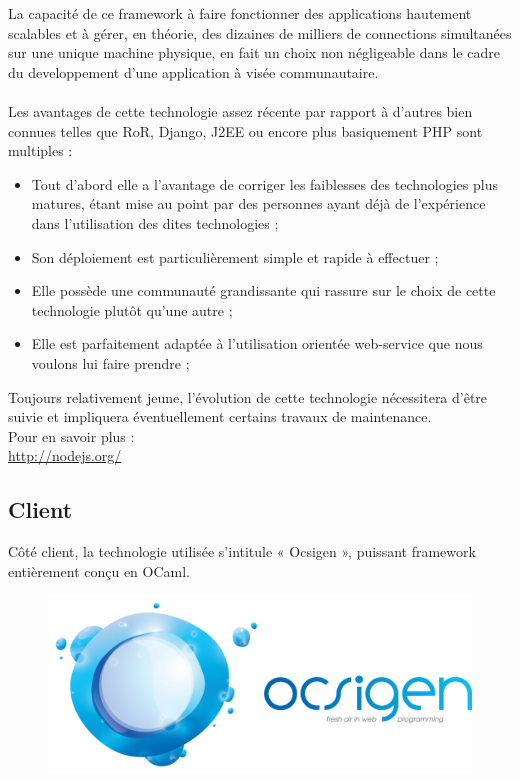 \documentclass{life-fr}
\begin{document}
La capacité de ce framework à faire fonctionner des applications hautement scalables et à gérer, en théorie, des dizaines de milliers de connections simultanées sur une unique machine physique, en fait un choix non négligeable dans le cadre du developpement d'une application à visée communautaire.\\
\\
\newpage
Les avantages de cette technologie assez récente par rapport à d'autres bien connues telles que RoR, Django, J2EE ou encore plus basiquement PHP sont multiples :\\
\begin{itemize}
  \item Tout d'abord elle a l'avantage de corriger les faiblesses des technologies plus matures, étant mise au point par des personnes ayant déjà de l'expérience dans l'utilisation des dites technologies ;
  \item Son déploiement est particulièrement simple et rapide à effectuer ;
  \item Elle possède une communauté grandissante qui rassure sur le choix de cette technologie plutôt qu'une autre ;
  \item Elle est parfaitement adaptée à l'utilisation orientée web-service que nous voulons lui faire prendre ;
\end{itemize}

Toujours relativement jeune, l'évolution de cette technologie nécessitera d'être suivie et impliquera éventuellement certains travaux de maintenance.\\

Pour en savoir plus :\\
\url{http://nodejs.org/}
\subsection{Client}

Côté client, la technologie utilisée s'intitule « Ocsigen », puissant framework entièrement conçu en OCaml.\\


\begin{figure}[H]
  \begin{center}
    \includegraphics[width=13cm]{img/ocsigen.png}
  \end{center}
\end{figure}
\end{document}
